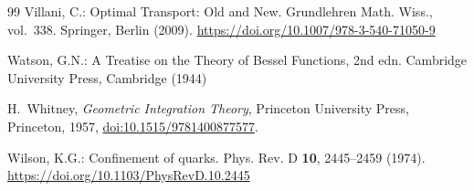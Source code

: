 \documentclass[11pt]{amsart}
\theoremstyle{definition}
\theoremstyle{remark}
\numberwithin{equation}{section}
\begin{document}
\begin{thebibliography}{99}
Villani, C.: Optimal Transport: Old and New. Grundlehren Math. Wiss.,
vol.~338. Springer, Berlin (2009).
\href{https://doi.org/10.1007/978-3-540-71050-9}{https://doi.org/10.1007/978-3-540-71050-9}

Watson, G.N.: A Treatise on the Theory of Bessel Functions, 2nd edn. Cambridge University Press, Cambridge (1944)

H.~Whitney, \emph{Geometric Integration Theory}, Princeton University
Press, Princeton, 1957,
\href{https://doi.org/10.1515/9781400877577}{doi:10.1515/9781400877577}.

Wilson, K.G.: Confinement of quarks. Phys. Rev. D \textbf{10}, 2445--2459
(1974).
\href{https://doi.org/10.1103/PhysRevD.10.2445}{https://doi.org/10.1103/PhysRevD.10.2445}

\end{thebibliography}
\end{document}

